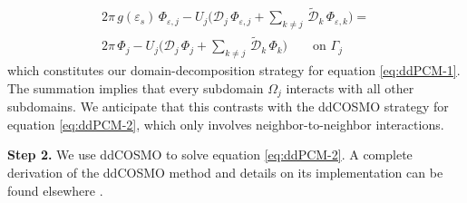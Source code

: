 \documentclass[aip,jcp,a4paper,11pt]{revtex4-1}
\begin{document}
\begin{multline}\label{eq:1}
2\pi \, g(\varepsilon_s) \, \Phi_{\varepsilon,j} - U_j \bigg( {\mathcal{D}}_j \, \Phi_{\varepsilon,j} + \sum_{k \ne j} \, \tilde{\mathcal{D}}_{k} \, \Phi_{\varepsilon,k}  \bigg) = \\ 2 \pi \, {\Phi_j} - U_j \bigg( {\mathcal{D}}_j \,\Phi_{j} + \sum_{k \ne j} \, \tilde{\mathcal{D}}_{k} \, \Phi_{k}  \bigg) \qquad \text{on }\Gamma_j
\end{multline}
which constitutes our domain-decomposition strategy for equation \eqref{eq:ddPCM-1}. The summation implies that every subdomain $\Omega_j$ interacts with all other subdomains. We anticipate that this contrasts with the ddCOSMO strategy for equation \eqref{eq:ddPCM-2}, which only involves neighbor-to-neighbor interactions.

{\bf Step 2.} 
We use ddCOSMO to solve equation \eqref{eq:ddPCM-2}. A complete derivation of the ddCOSMO method and details on its implementation can be found elsewhere \cite{Cances_JCP_ddCOSMO,Lipparini_JCTC_ddCOSMO}. 

\end{document}
